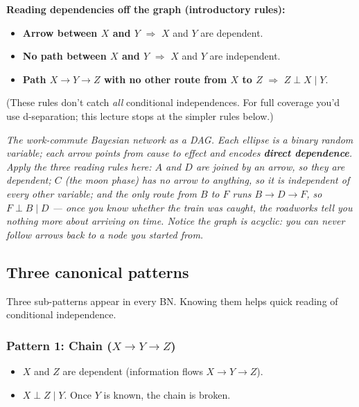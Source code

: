 \documentclass[11pt, a4paper]{article}
\begin{document}
\textbf{Reading dependencies off the graph (introductory rules):}
\begin{itemize}
  \item \textbf{Arrow between $X$ and $Y$} $\Rightarrow$ $X$ and $Y$ are dependent.
  \item \textbf{No path between $X$ and $Y$} $\Rightarrow$ $X$ and $Y$ are independent.
  \item \textbf{Path $X \to Y \to Z$ with no other route from $X$ to $Z$} $\Rightarrow$ $Z \perp X \mid Y$.
\end{itemize}

(These rules don't catch \emph{all} conditional independences. For full coverage you'd use d-separation; this lecture stops at the simpler rules below.)

\begin{center}

\footnotesize\textit{The work-commute Bayesian network as a DAG. Each ellipse is a binary random variable; each arrow points from cause to effect and encodes \textbf{direct dependence}. Apply the three reading rules here: $A$ and $D$ are joined by an arrow, so they are dependent; $C$ (the moon phase) has no arrow to anything, so it is independent of every other variable; and the only route from $B$ to $F$ runs $B \to D \to F$, so $F \perp B \mid D$ --- once you know whether the train was caught, the roadworks tell you nothing more about arriving on time. Notice the graph is acyclic: you can never follow arrows back to a node you started from.}
\end{center}

\subsection{Three canonical patterns}

Three sub-patterns appear in every BN. Knowing them helps quick reading of conditional independence.

\subsubsection*{Pattern 1: Chain ($X \to Y \to Z$)}

\begin{itemize}
  \item $X$ and $Z$ are dependent (information flows $X \to Y \to Z$).
  \item $X \perp Z \mid Y$. Once $Y$ is known, the chain is broken.
\end{itemize}
\end{document}

